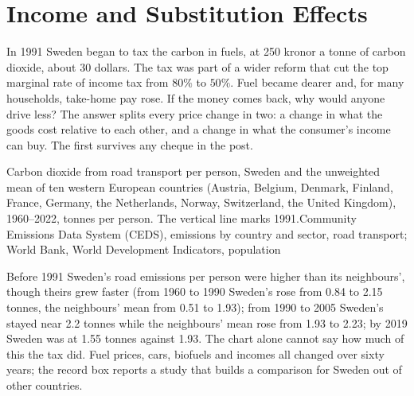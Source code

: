 \chapter{Income and Substitution Effects}\label{ch:b1:income-and-substitution-effects}

In 1991 Sweden began to tax the carbon in fuels, at 250 kronor a tonne of
carbon dioxide, about 30 dollars. %
The tax was part of a wider reform that cut the top marginal rate of income
tax from $80\%$ to $50\%$. %
Fuel became dearer and, for many households, take-home pay rose. If the
money comes back, why would anyone drive less? The answer splits every
price change in two: a change in what the goods cost relative to each
other, and a change in what the consumer's income can buy. The first
survives any cheque in the post.

\begin{openingchart}{Carbon dioxide from road transport per person, Sweden
and the unweighted mean of ten western European countries (Austria,
Belgium, Denmark, Finland, France, Germany, the Netherlands, Norway,
Switzerland, the United Kingdom), 1960--2022, tonnes per person. The
vertical line marks 1991.}{Community Emissions Data System (CEDS),
emissions by country and sector, road transport; World Bank, World
Development Indicators, population}
\end{openingchart}

Before 1991 Sweden's road emissions per person were higher than its
neighbours', though theirs grew faster (from 1960 to 1990 Sweden's rose
from 0.84 to 2.15 tonnes, the neighbours' mean from 0.51 to 1.93); %
from 1990 to 2005 Sweden's stayed near 2.2 tonnes while the
neighbours' mean rose from 1.93 to 2.23; by 2019 Sweden was at 1.55 tonnes
against 1.93. %
The chart alone cannot say how much of this the tax did. Fuel prices,
cars, biofuels and incomes all changed over sixty years; the record box
reports a study that builds a comparison for Sweden out of other
countries.

